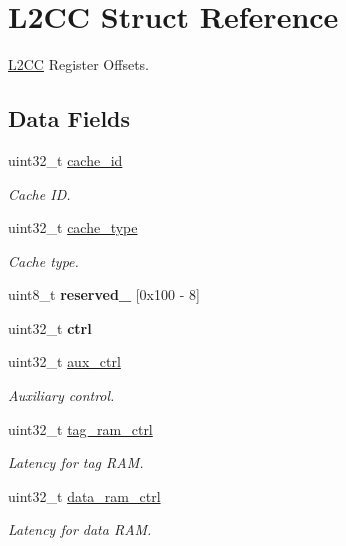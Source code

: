 \hypertarget{structL2CC}{}\section{L2\+CC Struct Reference}
\label{structL2CC}


\mbox{\hyperlink{structL2CC}{L2\+CC}} Register Offsets.  


\subsection*{Data Fields}
\begin{DoxyCompactItemize}
\item 
uint32\+\_\+t \mbox{\hyperlink{group__L2C-310__cache_ga906c77e66f73058edc5197e7cacf47f2}{cache\+\_\+id}}
\begin{DoxyCompactList}\small\item\em Cache ID. \end{DoxyCompactList}\item 
uint32\+\_\+t \mbox{\hyperlink{group__L2C-310__cache_ga0bb676a1f10455046437fced13d2e0c9}{cache\+\_\+type}}
\begin{DoxyCompactList}\small\item\em Cache type. \end{DoxyCompactList}\item 
uint8\+\_\+t {\bfseries reserved\+\_} \mbox{[}0x100 -\/ 8\mbox{]}
\item 
uint32\+\_\+t {\bfseries ctrl}
\item 
uint32\+\_\+t \mbox{\hyperlink{group__L2C-310__cache_ga163d40ba8e125c80645e9ee4f0675cba}{aux\+\_\+ctrl}}
\begin{DoxyCompactList}\small\item\em Auxiliary control. \end{DoxyCompactList}\item 
uint32\+\_\+t \mbox{\hyperlink{group__L2C-310__cache_gaeeb3f145047de2a8620ab791b25c5314}{tag\+\_\+ram\+\_\+ctrl}}
\begin{DoxyCompactList}\small\item\em Latency for tag R\+AM. \end{DoxyCompactList}\item 
uint32\+\_\+t \mbox{\hyperlink{group__L2C-310__cache_gacc2ea3f16556bba6560d489614f628bd}{data\+\_\+ram\+\_\+ctrl}}
\begin{DoxyCompactList}\small\item\em Latency for data R\+AM. \end{DoxyCompactList}\item 

\end{DoxyCompactItemize}
